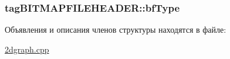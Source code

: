 \hypertarget{structtag_b_i_t_m_a_p_f_i_l_e_h_e_a_d_e_r_a64ced0b35fb93012ce3d66b2f1dd5bb8}{
\subsubsection[{bf\+Type}]{ tag\+B\+I\+T\+M\+A\+P\+F\+I\+L\+E\+H\+E\+A\+D\+E\+R\+::bf\+Type}}\label{structtag_b_i_t_m_a_p_f_i_l_e_h_e_a_d_e_r_a64ced0b35fb93012ce3d66b2f1dd5bb8}


Объявления и описания членов структуры находятся в файле\+:\begin{DoxyCompactItemize}
\item 
\hyperlink{2dgraph_8cpp}{2dgraph.\+cpp}\end{DoxyCompactItemize}
